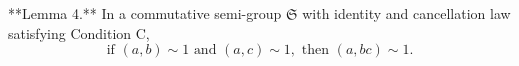 **Lemma 4.** In a commutative semi-group $\mathfrak{S}$ with identity and cancellation law satisfying Condition C,
$$\text{if } (a, b) \sim 1 \text{ and } (a, c) \sim 1, \text{ then } (a, bc) \sim 1.$$
